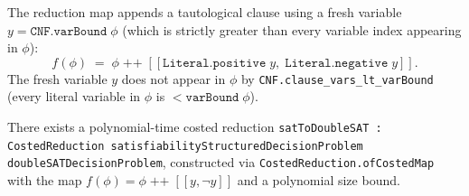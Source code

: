 \begin{definition}
  \label{def:sat_to_double_sat_map}
  The reduction map appends a tautological clause using a fresh variable
  $y = \texttt{CNF.varBound}\;\phi$ (which is strictly greater than every
  variable index appearing in $\phi$):
  \[
    f(\phi) \;=\; \phi \;\texttt{++}\;
      [[\texttt{Literal.positive}\;y,\;\texttt{Literal.negative}\;y]].
  \]
  The fresh variable $y$ does not appear in $\phi$ by
  \texttt{CNF.clause\_vars\_lt\_varBound} (every literal variable in $\phi$
  is $< \texttt{varBound}\;\phi$).
\end{definition}

\begin{theorem}
  \label{thm:sat_to_double_sat}
 There exists a polynomial-time costed reduction
  \texttt{satToDoubleSAT : CostedReduction satisfiabilityStructuredDecisionProblem
  doubleSATDecisionProblem}, constructed via
  \texttt{CostedReduction.ofCostedMap} with the map
  $f(\phi) = \phi \;\texttt{++}\; [[y, \neg y]]$ and a polynomial size bound.
\end{theorem}

